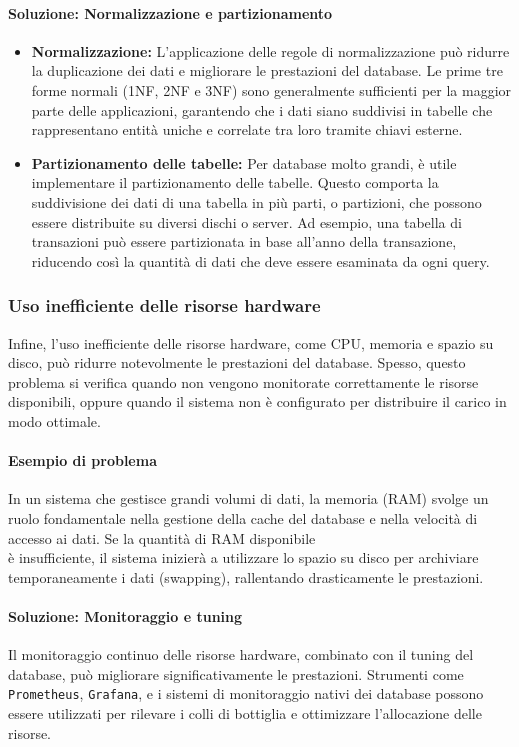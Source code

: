\paragraph{Soluzione: Normalizzazione e partizionamento}
\begin{itemize}
    \item \textbf{Normalizzazione:} L'applicazione delle regole di normalizzazione può ridurre la duplicazione dei dati e migliorare le prestazioni del database. Le prime tre forme normali (1NF, 2NF e 3NF) sono generalmente sufficienti per la maggior parte delle applicazioni, garantendo che i dati siano suddivisi in tabelle che rappresentano entità uniche e correlate tra loro tramite chiavi esterne.
    \item \textbf{Partizionamento delle tabelle:} Per database molto grandi, è utile implementare il partizionamento delle tabelle. Questo comporta la suddivisione dei dati di una tabella in più parti, o partizioni, che possono essere distribuite su diversi dischi o server. Ad esempio, una tabella di transazioni può essere partizionata in base all'anno della transazione, riducendo così la quantità di dati che deve essere esaminata da ogni query.
\end{itemize}

\subsubsection{Uso inefficiente delle risorse hardware}
Infine, l'uso inefficiente delle risorse hardware, come CPU, memoria e spazio su disco, può ridurre notevolmente le prestazioni del database. Spesso, questo problema si verifica quando non vengono monitorate correttamente le risorse disponibili, oppure quando il sistema non è configurato per distribuire il carico in modo ottimale.

\paragraph{Esempio di problema}
In un sistema che gestisce grandi volumi di dati, la memoria (RAM) svolge un ruolo fondamentale nella gestione della cache del database e nella velocità di accesso ai dati. Se la quantit\`a di RAM disponibile \\è insufficiente, il sistema inizier\`a a utilizzare lo spazio su disco per archiviare temporaneamente i dati (swapping), rallentando drasticamente le prestazioni.

\paragraph{Soluzione: Monitoraggio e tuning}
Il monitoraggio continuo delle risorse hardware, combinato con il tuning del database, può migliorare significativamente le prestazioni. Strumenti come \texttt{Prometheus}, \texttt{Grafana}, e i sistemi di monitoraggio nativi dei database possono essere utilizzati per rilevare i colli di bottiglia e ottimizzare l'allocazione delle risorse.

